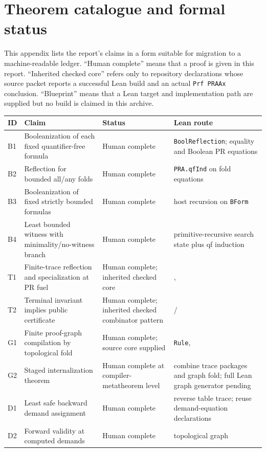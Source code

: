 \section{Theorem catalogue and formal status}
\label{app:catalog}

This appendix lists the report's claims in a form suitable for migration to a
machine-readable ledger.  ``Human complete'' means that a proof is given in
this report.  ``Inherited checked core'' refers only to repository declarations
whose source packet reports a successful Lean build and an actual
\texttt{Prf PRAAx} conclusion.  ``Blueprint'' means that a Lean target and
implementation path are supplied but no build is claimed in this archive.

\begin{longtable}{@{}L{0.07\textwidth}L{0.35\textwidth}L{0.19\textwidth}L{0.31\textwidth}@{}}
\toprule
ID & Claim & Status & Lean route \\
\midrule
\endhead
B1 & Booleanization of each fixed quantifier-free formula & Human complete &
\texttt{BoolReflection}; equality and Boolean PR equations \\
B2 & Reflection for bounded all/any folds & Human complete &
\texttt{PRA.qfInd} on fold equations \\
B3 & Booleanization of fixed strictly bounded formulas & Human complete & host
recursion on \texttt{BForm} \\
B4 & Least bounded witness with minimality/no-witness branch & Human complete &
primitive-recursive search state plus qf induction \\
T1 & Finite-trace reflection and specialization at PR fuel & Human complete;
inherited checked core & ,
 \\
T2 & Terminal invariant implies public certificate & Human complete; inherited
checked combinator pattern &  / 
 \\
G1 & Finite proof-graph compilation by topological fold & Human complete;
source core supplied & \texttt{Rule},  \\
G2 & Staged internalization theorem & Human complete at compiler-metatheorem
level & combine trace packages and graph fold; full Lean graph generator pending \\
D1 & Least safe backward demand assignment & Human complete & reverse table
trace; reuse demand-equation declarations \\
D2 & Forward validity at computed demands & Human complete & topological graph

\end{longtable}
